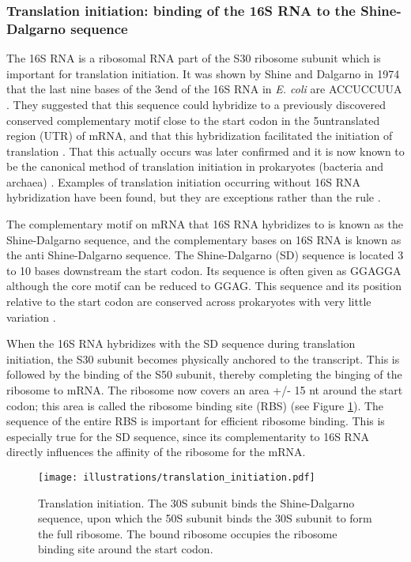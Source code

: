\subsubsection{Translation initiation: binding of the 16S RNA to the
Shine-Dalgarno sequence}
The 16S RNA is a ribosomal RNA part of the S30 ribosome subunit which is
important for translation initiation. It was shown by Shine and Dalgarno in
1974 that the last nine bases of the 3\ppp end of the 16S RNA in \textit{E.
coli} are ACCUCCUUA \cite{shine_3-terminal_1974}. They suggested that this
sequence could hybridize to a previously discovered conserved complementary
motif close to the start codon in the 5\ppp untranslated region (UTR) of mRNA,
and that this hybridization facilitated the initiation of translation
\cite{shine_3-terminal_1974}. That this actually occurs was later confirmed and
it is now known to be the canonical method of translation initiation in
prokaryotes (bacteria and archaea) \cite{nakagawa_dynamic_2010}. Examples of
translation initiation occurring without 16S RNA hybridization have been found,
but they are exceptions rather than the rule \cite{skorski_highly_2006,
boni_non-canonical_2001}.

The complementary motif on mRNA that 16S RNA hybridizes to is known as the
Shine-Dalgarno sequence, and the complementary bases on 16S RNA is known as the
anti Shine-Dalgarno sequence. The Shine-Dalgarno (SD) sequence is located 3 to
10 bases downstream the start codon. Its sequence is often given as GGAGGA
although the core motif can be reduced to GGAG. This sequence and its position
relative to the start codon are conserved across prokaryotes with very little
variation \cite{nakagawa_dynamic_2010}. 

When the 16S RNA hybridizes with the SD sequence during translation initiation,
the S30 subunit becomes physically anchored to the transcript. This is followed
by the binding of the S50 subunit, thereby completing the binging of the
ribosome to mRNA. The ribosome now covers an area +/- 15 nt around the start
codon; this area is called the ribosome binding site (RBS)
\cite{kozak_regulation_2005} (see Figure \ref{fig:translation_initiation}). The
sequence of the entire RBS is important for efficient ribosome binding. This is
especially true for the SD sequence, since its complementarity to 16S RNA
directly influences the affinity of the ribosome for the mRNA.

\begin{figure}[htb]
	\begin{center}
		\texttt{[image: illustrations/translation\_initiation.pdf]}
	\end{center}
	\caption{Translation initiation. The 30S subunit binds the Shine-Dalgarno
	sequence, upon which the 50S subunit binds the 30S subunit to form the full
	ribosome. The bound ribosome occupies the ribosome binding site around the
	start codon.}
	\label{fig:translation_initiation}
\end{figure}

